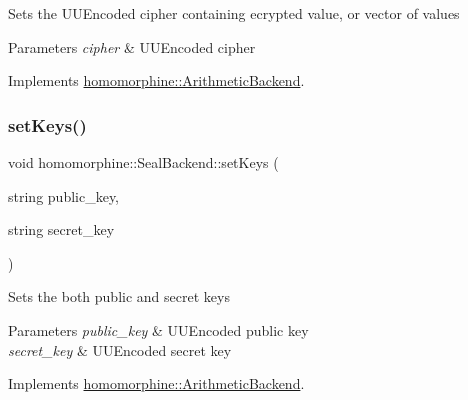 Sets the U\+U\+Encoded cipher containing ecrypted value, or vector of values


\begin{DoxyParams}{Parameters}
{\em cipher} & U\+U\+Encoded cipher \\
\hline
\end{DoxyParams}


Implements \hyperlink{classhomomorphine_1_1_arithmetic_backend_af9b2d3b33a03d79facdf113c9560fc0b}{homomorphine\+::\+Arithmetic\+Backend}.

\mbox{\label{classhomomorphine_1_1_seal_backend_a42afcc2823d616edc6be0e3950cf7196}} 
\subsubsection{\texorpdfstring{set\+Keys()}{setKeys()}}
{\footnotesize\ttfamily void homomorphine\+::\+Seal\+Backend\+::set\+Keys (\begin{DoxyParamCaption}\item[{string}]{public\+\_\+key,  }\item[{string}]{secret\+\_\+key }\end{DoxyParamCaption})\hspace{0.3cm}{\ttfamily [virtual]}}

Sets the both public and secret keys


\begin{DoxyParams}{Parameters}
{\em public\+\_\+key} & U\+U\+Encoded public key \\
\hline
{\em secret\+\_\+key} & U\+U\+Encoded secret key \\
\hline
\end{DoxyParams}


Implements \hyperlink{classhomomorphine_1_1_arithmetic_backend_ac78f4b42dce3dce23edd81dba60b16c8}{homomorphine\+::\+Arithmetic\+Backend}.

\mbox{\label{classhomomorphine_1_1_seal_backend_a6d34008acb06ff1d6743f9163fcd41fb}} 
